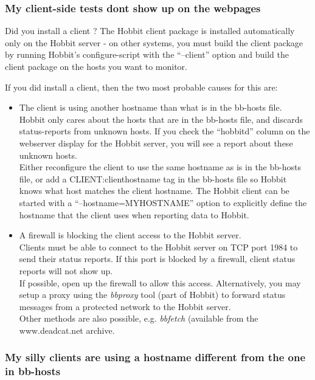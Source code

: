 \hline 
\subsubsection*{My client-side tests dont show up on the webpages}


 Did you install a client ? The Hobbit client package is installed automatically only on the Hobbit server - on other systems, you must build the client package by running Hobbit's configure-script with the ``--client'' option and build the client package on the hosts you want to monitor.


 If you did install a client, then the two most probable causes for this are:
\begin{itemize}
\item The client is using another hostname than what is in the bb-hosts file.\\ 
 Hobbit only cares about the hosts that are in the bb-hosts file, and discards status-reports from unknown hosts. If you check the ``hobbitd'' column on the webserver display for the Hobbit server, you will see a report about these unknown hosts.\\ 
 Either reconfigure the client to use the same hostname as is in the bb-hosts file, or add a CLIENT:clienthostname tag in the bb-hosts file so Hobbit knows what host matches the client hostname. The Hobbit client can be started with a ``--hostname=MYHOSTNAME'' option to explicitly define the hostname that the client uses when reporting data to Hobbit.
\item A firewall is blocking the client access to the Hobbit server.\\ 
 Clients must be able to connect to the Hobbit server on TCP port 1984 to send their status reports. If this port is blocked by a firewall, client status reports will not show up.\\ 
 If possible, open up the firewall to allow this access. Alternatively, you may setup a proxy using the \emph{bbproxy}
 tool (part of Hobbit) to forward status messages from a protected network to the Hobbit server.\\ 
 Other methods are also possible, e.g. \emph{bbfetch}
 (available from the www.deadcat.net archive. 

\end{itemize}
\hline 
\subsubsection*{My silly clients are using a hostname different from the one in bb-hosts}



